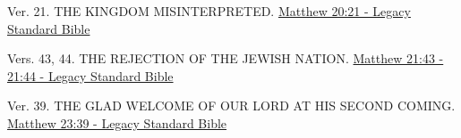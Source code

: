 \documentclass[
  ignorenonframetext,
]{beamer}
\begin{document}
\begin{frame}{20}
\label{section-154}
\begin{block}{Ver. 21. THE KINGDOM MISINTERPRETED.}
\label{ver.-21.-the-kingdom-misinterpreted.}
\href{https://read.lsbible.org/?q=matt20\%3A21}{Matthew 20:21 - Legacy
Standard Bible}
\end{block}
\end{frame}

\begin{frame}{21}
\label{section-155}
\begin{block}{Vers. 43, 44. THE REJECTION OF THE JEWISH NATION.}
\label{vers.-43-44.-the-rejection-of-the-jewish-nation.}
\href{https://read.lsbible.org/?q=matt21\%3A43-44}{Matthew 21:43 - 21:44
- Legacy Standard Bible}
\end{block}
\end{frame}

\begin{frame}{23}
\label{section-156}
\begin{block}{Ver. 39. THE GLAD WELCOME OF OUR LORD AT HIS SECOND
COMING.}
\label{ver.-39.-the-glad-welcome-of-our-lord-at-his-second-coming.}
\href{https://read.lsbible.org/?q=matt23\%3A39}{Matthew 23:39 - Legacy
Standard Bible}
\end{block}
\end{frame}
\end{document}
